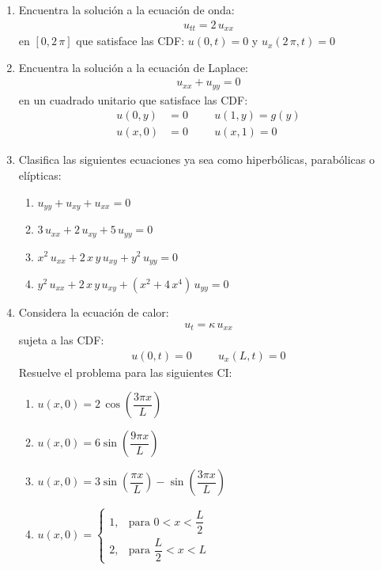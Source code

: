 \documentclass[hidelinks,12pt]{article}
\begin{document}
\begin{enumerate}
    \item Encuentra la solución a la ecuación de onda:
        \begin{align*}
            u_{tt} = 2 \, u_{xx} 
        \end{align*}
    en $[0, 2 \, \pi]$ que satisface las CDF: $u (0, t) = 0$ y $u_{x} (2 \, \pi, t) = 0$
    \item Encuentra la solución a la ecuación de Laplace:
        \begin{align*}
            u_{xx} + u_{yy} = 0
        \end{align*}
    en un cuadrado unitario que satisface las CDF:
        \begin{align*}
            u (0, y) &= 0 \hspace{1cm} u (1, y) = g (y) \\[0.5em]
            u (x, 0) &= 0  \hspace{1cm} u (x, 1) = 0
        \end{align*}
        \item Clasifica las siguientes ecuaciones ya sea como hiperbólicas, parabólicas o elípticas:
            \begin{enumerate}
            \item $u_{yy} + u_{xy} + u_{xx} = 0$
            \item $3 \, u_{xx} + 2 \, u_{xy} + 5 \, u_{yy} = 0$
            \item $x^{2} \, u_{xx} + 2 \, x \, y \, u_{xy} + y^{2} \, u_{yy} = 0$
            \item $y^{2} \, u_{xx} + 2 \, x \, y \, u_{xy} + \left( x^{2} + 4 \, x^{4} \right) \, u_{yy} = 0$
        \end{enumerate}
        \item Considera la ecuación de calor:
            \begin{align*}
                u_{t} = \kappa \, u_{xx}
            \end{align*}
        sujeta a las CDF:
            \begin{align*}
            u(0, t) = 0 \hspace{1cm} u_{x} (L, t) = 0
            \end{align*}
        Resuelve el problema para las siguientes CI:
            \begin{enumerate}
                \item $u (x, 0) = 2 \, \cos \left( \dfrac{3 \pi x}{L} \right)$
                \item $u (x, 0) = 6 \sin \left( \dfrac{9 \pi x}{L} \right)$
                \item $u (x, 0) = 3 \sin \left( \dfrac{\pi x}{L} \right) - \sin \left( \dfrac{3 \pi x}{L} \right)$
                \item $u (x, 0) = \begin{cases}
                1, & \text{para } 0 < x < \dfrac{L}{2} \\[1em]
                2, & \text{para } \dfrac{L}{2} < x < L
                \end{cases}$
            \end{enumerate}
    \end{enumerate}
\end{document}
